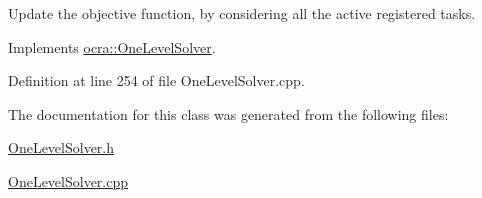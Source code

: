 Update the objective function, by considering all the active registered tasks. 

Implements \hyperlink{classocra_1_1OneLevelSolver_a150b377a35e30ae9c347147c10fddb33}{ocra\+::\+One\+Level\+Solver}.



Definition at line 254 of file One\+Level\+Solver.\+cpp.



The documentation for this class was generated from the following files\+:\begin{DoxyCompactItemize}
\item 
\hyperlink{OneLevelSolver_8h}{One\+Level\+Solver.\+h}\item 
\hyperlink{OneLevelSolver_8cpp}{One\+Level\+Solver.\+cpp}\end{DoxyCompactItemize}
